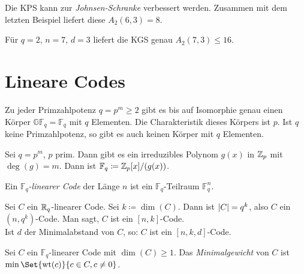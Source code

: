 \documentclass{cheat-sheet}
\newcommand{\F}{\mathbb{F}} %
\newcommand{\GF}{\mathbb{GF}} %
\DeclareMathOperator{\wt}{wt} %
\begin{document}
\begin{samepage}

\begin{bem}
  Die KPS kann zur \emph{Johnsen-Schranke} verbessert werden.
  Zusammen mit dem letzten Beispiel liefert diese $A_2(6, 3) = 8$.
\end{bem}

\begin{bsp}
  Für $q{=}2$, $n{=}7$, $d{=}3$ liefert die KGS genau $A_2(7,3) \leq 16$.
\end{bsp}

\section{Lineare Codes}

\end{samepage}


\begin{bem}
  Zu jeder Primzahlpotenz $q = p^m \geq 2$ gibt es bis auf Isomorphie genau einen Körper $\GF_q = \F_q$ mit $q$ Elementen. Die Charakteristik dieses Körpers ist $p$. Ist $q$ keine Primzahlpotenz, so gibt es auch keinen Körper mit $q$ Elementen.
\end{bem}

\begin{konstr}
  Sei $q = p^m$, $p$ prim. Dann gibt es ein irreduzibles Polynom $g(x)$ in $\mathbb{Z}_p$ mit $\deg(g) = m$.
  Dann ist $\F_q \coloneqq \Z_p[x]/(g(x))$.
\end{konstr}



\begin{defn}
  Ein \emph{$\F_q$-linearer Code} der Länge $n$ ist ein $\F_q$-Teilraum $\F_q^n$.
\end{defn}

\begin{nota}
  Sei $C$ ein $\mathbb{R}_q$-linearer Code.
  Sei $k \coloneqq \dim(C)$.
  Dann ist $\lvert C\rvert = q^k$, also $C$ ein $(n, q^k)$-Code.
  Man sagt, $C$ ist ein $[n, k]$-Code. \\
  Ist $d$ der Minimalabstand von $C$, so: $C$ ist ein $[n,k,d]$-Code.
\end{nota}

\begin{defn}
  Sei $C$ ein $\F_q$-linearer Code mit $\dim(C) \geq 1$.
  Das \emph{Minimalgewicht} von $C$ ist $\min \Set{\wt(c)}{c \in C, c \neq 0}$.
\end{defn}
\end{document}
